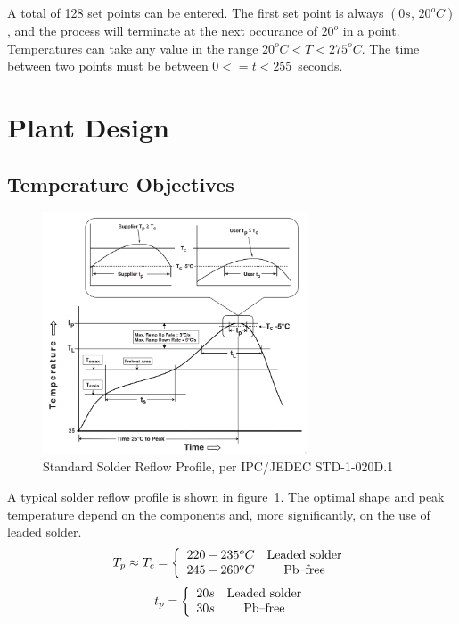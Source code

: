 \documentclass[10pt, twocolumn]{article}
\begin{document}
A total of 128 set points can be entered. The first set point is always $(0s,\,20^{o}C)$,
and the process will terminate at the next occurance of $20^{o}$ in a point.
Temperatures can take any value in the range \mbox{$20^{o}C<T<275^{o}C$.}
The time between two points must be between \mbox{$0<=t<255$ seconds.}

\section{Plant Design}

\subsection{Temperature Objectives}

\begin{figure}
	\centering
	\includegraphics[width=0.7\textwidth]{Figures/standard-reflow-profile.pdf}
	\caption{Standard Solder Reflow Profile, per IPC/JEDEC STD-1-020D.1}
	\label{standard-reflow-profile}
\end{figure}

A typical solder reflow profile is shown in
\hyperref[standard-reflow-profile]{\mbox{figure \ref{standard-reflow-profile}}}.
The optimal shape and peak temperature depend on the components and,
more significantly, on the use of leaded solder.
\begin{equation*}
T_{p}\approx T_{c}=\left\{\begin{array}{c c}
220-235^{o}C	&\textrm{Leaded solder}	\\
245-260^{o}C	&\textrm{Pb--free}	\\
\end{array}\right.
\end{equation*}
\begin{equation*}
t_{p}=\left\{\begin{array}{c c}
20s	&\textrm{Leaded solder}	\\
30s	&\textrm{Pb--free}	\\
\end{array}\right.
\end{equation*}
\end{document}
